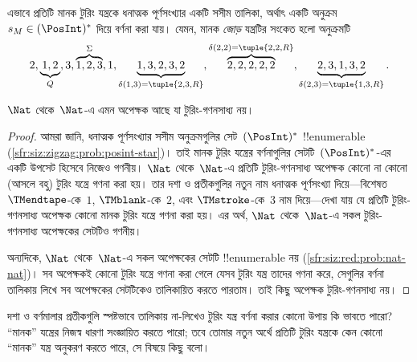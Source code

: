\documentclass[../../../include/open-logic-section]{subfiles}
\begin{document}
\begin{explain}
এভাবে প্রতিটি মানক টুরিং যন্ত্রকে ধনাত্মক পূর্ণসংখ্যার একটি সসীম তালিকা,
অর্থাৎ একটি অনুক্রম $s_M \in (\PosInt)^*$ দিয়ে বর্ণনা করা যায়। যেমন,
মানক \emph{জোড়} যন্ত্রটির সংকেত হলো অনুক্রমটি
\[
2, \underbrace{1, 2}_Q, 3, \overbrace{1, 2, 3}^\Sigma, 1, \underbrace{1, 3, 2, 3, 2}_{\delta(1,3) = \tuple{2,3,R}}, 
\overbrace{2, 2, 2, 2, 2}^{\delta(2,2) = \tuple{2,2,R}},
\underbrace{2, 3, 1, 3, 2}_{\delta(2,3) = \tuple{1,3,R}}.
\]
\end{explain}

\begin{thm}
$\Nat$ থেকে~$\Nat$-এ এমন অপেক্ষক আছে যা টুরিং-গণনসাধ্য নয়।
\end{thm}

\begin{proof}
আমরা জানি, ধনাত্মক পূর্ণসংখ্যার সসীম অনুক্রমগুলির সেট~$(\PosInt)^*$
!!{enumerable} (\cref{sfr:siz:zigzag:prob:posint-star})। তাই মানক টুরিং
যন্ত্রের বর্ণনাগুলির সেটটি~$(\PosInt)^*$-এর একটি উপসেট হিসেবে নিজেও
গণনীয়। $\Nat$ থেকে~$\Nat$-এ প্রতিটি টুরিং-গণনসাধ্য অপেক্ষক কোনো
না কোনো (আসলে বহু) টুরিং যন্ত্রে গণনা করা হয়। তার দশা ও প্রতীকগুলির নতুন
নাম ধনাত্মক পূর্ণসংখ্যা দিয়ে—বিশেষত $\TMendtape$-কে~$1$,
$\TMblank$-কে~$2$, এবং $\TMstroke$-কে~$3$ নাম দিয়ে—দেখা যায় যে প্রতিটি
টুরিং-গণনসাধ্য অপেক্ষক কোনো মানক টুরিং যন্ত্রে গণনা করা হয়। এর অর্থ,
$\Nat$ থেকে~$\Nat$-এ সকল টুরিং-গণনসাধ্য অপেক্ষকের সেটটিও গণনীয়।

অন্যদিকে, $\Nat$ থেকে~$\Nat$-এ সকল অপেক্ষকের সেটটি !!{enumerable} নয়
(\cref{sfr:siz:red:prob:nat-nat})। সব অপেক্ষকই কোনো টুরিং যন্ত্রে গণনা
করা গেলে যেসব টুরিং যন্ত্র তাদের গণনা করে, সেগুলির বর্ণনা তালিকায় লিখে
সব অপেক্ষকের সেটটিকেও তালিকায়িত করতে পারতাম। তাই কিছু অপেক্ষক
টুরিং-গণনসাধ্য নয়। 
\end{proof}

\begin{prob}
  দশা ও বর্ণমালার প্রতীকগুলি স্পষ্টভাবে তালিকায় না-লিখেও টুরিং যন্ত্র
  বর্ণনা করার কোনো উপায় কি ভাবতে পারো? “মানক” যন্ত্রের নিজস্ব ধারণা
  সংজ্ঞায়িত করতে পারো; তবে তোমার নতুন অর্থে প্রতিটি টুরিং যন্ত্রকে কেন
  কোনো “মানক” যন্ত্র অনুকরণ করতে পারে, সে বিষয়ে কিছু বলো।
\end{prob}
\end{document}
